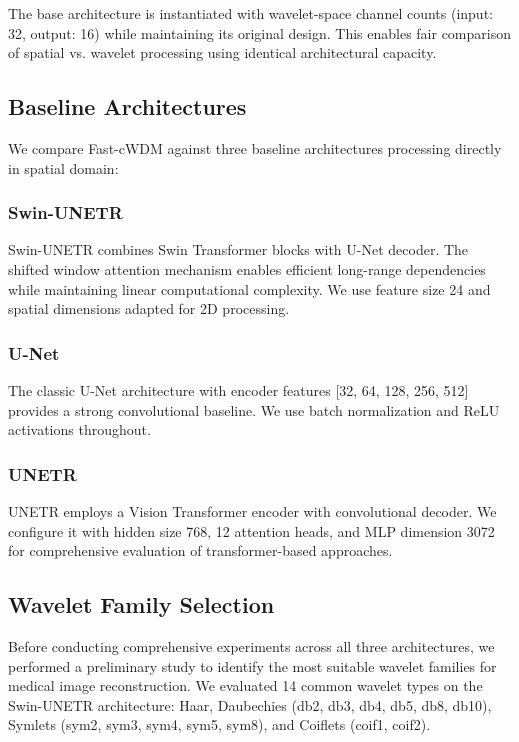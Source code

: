 \documentclass[conference]{IEEEtran}
\begin{document}
The base architecture is instantiated with wavelet-space channel counts (input: 32, output: 16) while maintaining its original design. This enables fair comparison of spatial vs. wavelet processing using identical architectural capacity.

\subsection{Baseline Architectures}

We compare Fast-cWDM against three baseline architectures processing directly in spatial domain:

\subsubsection{Swin-UNETR}

Swin-UNETR \cite{hatamizadeh2022swin} combines Swin Transformer blocks with U-Net decoder. The shifted window attention mechanism enables efficient long-range dependencies while maintaining linear computational complexity. We use feature size 24 and spatial dimensions adapted for 2D processing.

\subsubsection{U-Net}

The classic U-Net architecture \cite{ronneberger2015unet} with encoder features [32, 64, 128, 256, 512] provides a strong convolutional baseline. We use batch normalization and ReLU activations throughout.

\subsubsection{UNETR}

UNETR \cite{hatamizadeh2022unetr} employs a Vision Transformer encoder with convolutional decoder. We configure it with hidden size 768, 12 attention heads, and MLP dimension 3072 for comprehensive evaluation of transformer-based approaches.

\subsection{Wavelet Family Selection}

Before conducting comprehensive experiments across all three architectures, we performed a preliminary study to identify the most suitable wavelet families for medical image reconstruction. We evaluated 14 common wavelet types on the Swin-UNETR architecture: Haar, Daubechies (db2, db3, db4, db5, db8, db10), Symlets (sym2, sym3, sym4, sym5, sym8), and Coiflets (coif1, coif2).
\end{document}
